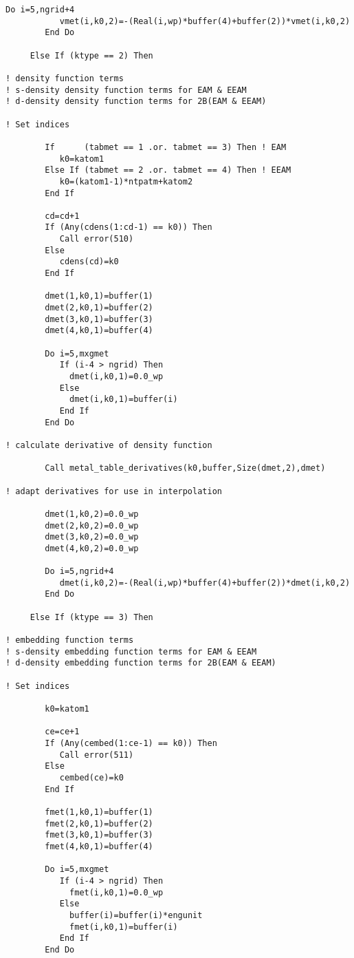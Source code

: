 \begin{lstlisting}[style=sFortran,caption={Add two numbers function}]
        Do i=5,ngrid+4
           vmet(i,k0,2)=-(Real(i,wp)*buffer(4)+buffer(2))*vmet(i,k0,2)
        End Do

     Else If (ktype == 2) Then

! density function terms
! s-density density function terms for EAM & EEAM
! d-density density function terms for 2B(EAM & EEAM)

! Set indices

        If      (tabmet == 1 .or. tabmet == 3) Then ! EAM
           k0=katom1
        Else If (tabmet == 2 .or. tabmet == 4) Then ! EEAM
           k0=(katom1-1)*ntpatm+katom2
        End If

        cd=cd+1
        If (Any(cdens(1:cd-1) == k0)) Then
           Call error(510)
        Else
           cdens(cd)=k0
        End If

        dmet(1,k0,1)=buffer(1)
        dmet(2,k0,1)=buffer(2)
        dmet(3,k0,1)=buffer(3)
        dmet(4,k0,1)=buffer(4)

        Do i=5,mxgmet
           If (i-4 > ngrid) Then
             dmet(i,k0,1)=0.0_wp
           Else
             dmet(i,k0,1)=buffer(i)
           End If
        End Do

! calculate derivative of density function

        Call metal_table_derivatives(k0,buffer,Size(dmet,2),dmet)

! adapt derivatives for use in interpolation

        dmet(1,k0,2)=0.0_wp
        dmet(2,k0,2)=0.0_wp
        dmet(3,k0,2)=0.0_wp
        dmet(4,k0,2)=0.0_wp

        Do i=5,ngrid+4
           dmet(i,k0,2)=-(Real(i,wp)*buffer(4)+buffer(2))*dmet(i,k0,2)
        End Do

     Else If (ktype == 3) Then

! embedding function terms
! s-density embedding function terms for EAM & EEAM
! d-density embedding function terms for 2B(EAM & EEAM)

! Set indices

        k0=katom1

        ce=ce+1
        If (Any(cembed(1:ce-1) == k0)) Then
           Call error(511)
        Else
           cembed(ce)=k0
        End If

        fmet(1,k0,1)=buffer(1)
        fmet(2,k0,1)=buffer(2)
        fmet(3,k0,1)=buffer(3)
        fmet(4,k0,1)=buffer(4)

        Do i=5,mxgmet
           If (i-4 > ngrid) Then
             fmet(i,k0,1)=0.0_wp
           Else
             buffer(i)=buffer(i)*engunit
             fmet(i,k0,1)=buffer(i)
           End If
        End Do


\end{lstlisting}
